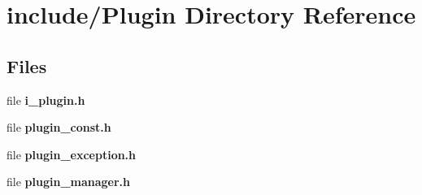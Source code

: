 \section{include/\+Plugin Directory Reference}
\label{dir_92efaab43d7c799eec55ad00d45d625a}
\subsection*{Files}
\begin{DoxyCompactItemize}
\item 
file {\bfseries i\+\_\+plugin.\+h}
\item 
file {\bfseries plugin\+\_\+const.\+h}
\item 
file {\bfseries plugin\+\_\+exception.\+h}
\item 
file {\bfseries plugin\+\_\+manager.\+h}
\end{DoxyCompactItemize}

